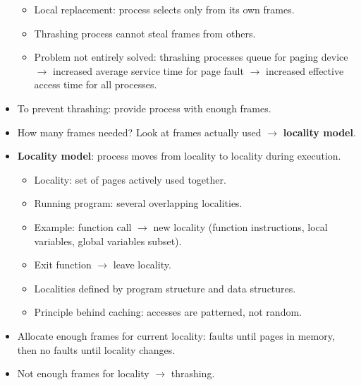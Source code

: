 \begin{itemize}
    \begin{itemize}
        \item Local replacement: process selects only from its own frames.
        \item Thrashing process cannot steal frames from others.
        \item Problem not entirely solved: thrashing processes queue for paging device $\rightarrow$ increased average service time for page fault $\rightarrow$ increased effective access time for all processes.
    \end{itemize}
    \item To prevent thrashing: provide process with enough frames.
    \item How many frames needed? Look at frames actually used $\rightarrow$ \textbf{locality model}.
    \item \textbf{Locality model}: process moves from locality to locality during execution.
    \begin{itemize}
        \item Locality: set of pages actively used together.
        \item Running program: several overlapping localities.
        \item Example: function call $\rightarrow$ new locality (function instructions, local variables, global variables subset).
        \item Exit function $\rightarrow$ leave locality.
        \item Localities defined by program structure and data structures.
        \item Principle behind caching: accesses are patterned, not random.
    \end{itemize}
    \item Allocate enough frames for current locality: faults until pages in memory, then no faults until locality changes.
    \item Not enough frames for locality $\rightarrow$ thrashing.
\end{itemize}

